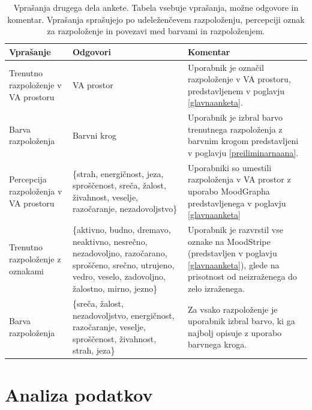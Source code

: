 \documentclass[a4paper, 12pt]{book}
\begin{document}
{\begin{table}[H]
\begin{center}
\begin{tabular}{| p{3.5cm} | p{4.5cm} | p{4.5cm} |}
\end{tabular}
\label{prvidel}
\end{center}
\end{table} 

\begin{table}[H]
\begin{center}
\caption{Vprašanja drugega dela ankete. Tabela vsebuje vprašanja, možne odgovore in komentar. Vprašanja sprašujejo po udeleženčevem razpoloženju, percepciji oznak za razpoloženje in povezavi med barvami in razpoloženjem.}
\begin{tabular}{| p{3.5cm} | p{4.5cm} | p{4.5cm} |}
\hline
Vprašanje & Odgovori & Komentar \\ \hline \hline
Trenutno razpoloženje v VA prostoru & VA prostor & Uporabnik je označil razpoloženje v VA prostoru, predstavljenem v poglavju \ref{glavnaanketa}. \\ \hline
Barva razpoloženja & Barvni krog & Uporabnik je izbral barvo trenutnega razpoloženja z barvnim krogom predstavljeni v poglavju \ref{preiliminarnaana}. \\ \hline
Percepcija razpoloženja v VA prostoru & \{strah, energičnost, jeza, sproščenost, sreča, žalost, živahnost, veselje, razočaranje, nezadovoljstvo\} & Uporabniki so umestili razpoloženja v VA prostor z uporabo MoodGrapha predstavljenega v poglavju \ref{glavnaanketa} \\ \hline
Trenutno razpoloženje z oznakami & \{aktivno, budno, dremavo, neaktivno, nesrečno, nezadovoljno, razočarano, sproščeno, srečno, utrujeno, vedro, veselo, zadovoljno, žalostno, mirno, jezno\} & Uporabnik je razvrstil vse oznake na MoodStripe (predstavljen v poglavju \ref{glavnaanketa}), glede na prisotnost od neizraženega do zelo izraženega. \\ \hline
Barva razpoloženja & \{sreča, žalost, nezadovoljstvo, energičnost, razočaranje, veselje, sproščenost, živahnost, strah, jeza\} & Za vsako razpoloženje je uporabnik izbral barvo, ki ga najbolj opisuje z uporabo barvnega kroga. \\ \hline

\end{tabular}
\label{drugidel}
\end{center}
\end{table}

\section{Analiza podatkov}

}
\end{document}
